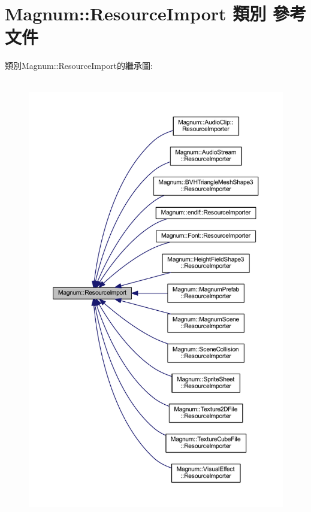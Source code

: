 \hypertarget{class_magnum_1_1_resource_import}{}\section{Magnum\+:\+:Resource\+Import 類別 參考文件}
\label{class_magnum_1_1_resource_import}


類別\+Magnum\+:\+:Resource\+Import的繼承圖\+:\nopagebreak
\begin{figure}[H]
\begin{center}
\leavevmode
\includegraphics[height=550pt]{class_magnum_1_1_resource_import__inherit__graph}
\end{center}
\end{figure}


